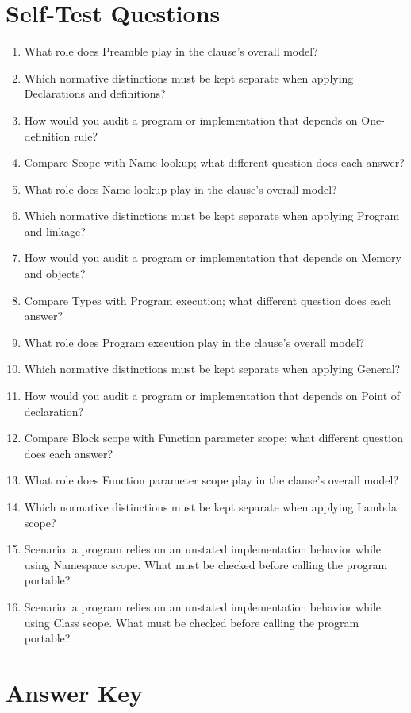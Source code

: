 \documentclass[11pt,letterpaper]{article}
\begin{document}
\section{Self-Test Questions}
\begin{enumerate}
\item What role does Preamble play in the clause's overall model?
\item Which normative distinctions must be kept separate when applying Declarations and definitions?
\item How would you audit a program or implementation that depends on One-definition rule?
\item Compare Scope with Name lookup; what different question does each answer?
\item What role does Name lookup play in the clause's overall model?
\item Which normative distinctions must be kept separate when applying Program and linkage?
\item How would you audit a program or implementation that depends on Memory and objects?
\item Compare Types with Program execution; what different question does each answer?
\item What role does Program execution play in the clause's overall model?
\item Which normative distinctions must be kept separate when applying General?
\item How would you audit a program or implementation that depends on Point of declaration?
\item Compare Block scope with Function parameter scope; what different question does each answer?
\item What role does Function parameter scope play in the clause's overall model?
\item Which normative distinctions must be kept separate when applying Lambda scope?
\item Scenario: a program relies on an unstated implementation behavior while using Namespace scope. What must be checked before calling the program portable?
\item Scenario: a program relies on an unstated implementation behavior while using Class scope. What must be checked before calling the program portable?
\end{enumerate}
\clearpage\section{Answer Key}
\end{document}
